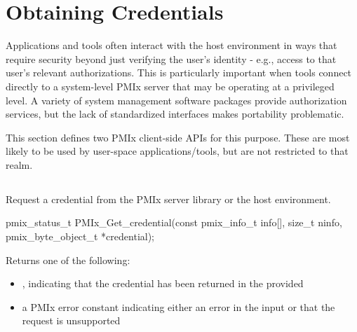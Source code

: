 \section{Obtaining Credentials}
\label{chap:api_security:obtain}

Applications and tools often interact with the host environment in ways that require security beyond just verifying the user's identity - e.g., access to that user's relevant authorizations. This is particularly important when tools connect directly to a system-level \ac{PMIx} server that may be operating at a privileged level. A variety of system management software packages provide authorization services, but the lack of standardized interfaces makes portability problematic.

This section defines two \ac{PMIx} client-side \acp{API} for this purpose. These are most likely to be used by user-space applications/tools, but are not restricted to that realm.

\subsection{}

\summary

Request a credential from the \ac{PMIx} server library or the host environment.

\format

\cspecificstart
\begin{codepar}
pmix_status_t
PMIx_Get_credential(const pmix_info_t info[], size_t ninfo,
                    pmix_byte_object_t *credential);
\end{codepar}
\cspecificend

\begin{arglist}
\end{arglist}

Returns one of the following:

\begin{itemize}
    \item {}, indicating that the credential has been returned in the provided 
    \item a \ac{PMIx} error constant indicating either an error in the input or that the request is unsupported
\end{itemize}

